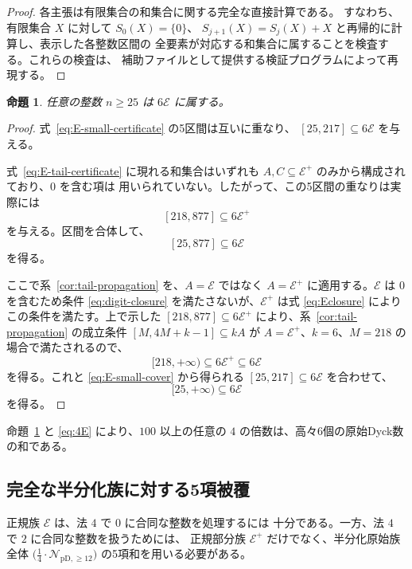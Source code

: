 \documentclass[12pt]{ltjsarticle}
\theoremstyle{plain}
\newtheorem{proposition}[theorem]{命題}
\theoremstyle{definition}
\theoremstyle{plain}
\newcommand{\Pset}{%
  \bigl(\tfrac{1}{4}\cdot\mathcal{N}_{\mathrm{pD},\geq 12}\bigr)%
}
\begin{document}
\begin{proof}
各主張は有限集合の和集合に関する完全な直接計算である。
すなわち、有限集合 $X$ に対して $S_0(X)=\{0\}$、
$S_{j+1}(X)=S_j(X)+X$ と再帰的に計算し、表示した各整数区間の
全要素が対応する和集合に属することを検査する。これらの検査は、
補助ファイルとして提供する検証プログラムによって再現する。
\end{proof}

\begin{proposition}\label{prop:E}
任意の整数 $n\geq25$ は $6\mathcal E$ に属する。
\end{proposition}

\begin{proof}
式~\eqref{eq:E-small-certificate} の5区間は互いに重なり、
$[25,217]\subseteq6\mathcal E$ を与える。

式~\eqref{eq:E-tail-certificate} に現れる和集合はいずれも
$A,C\subseteq\mathcal E^+$ のみから構成されており、$0$ を含む項は
用いられていない。したがって、この5区間の重なりは実際には
\[
 [218,877]\subseteq6\mathcal E^+
\]
を与える。区間を合体して、
\begin{equation}\label{eq:E-small-cover}
 [25,877]\subseteq6\mathcal E
\end{equation}
を得る。

ここで系~\ref{cor:tail-propagation} を、$A=\mathcal E$ ではなく
$A=\mathcal E^+$ に適用する。$\mathcal E$ は $0$ を含むため条件
\eqref{eq:digit-closure} を満たさないが、$\mathcal E^+$ は式
\eqref{eq:Eclosure} によりこの条件を満たす。上で示した
$[218,877]\subseteq6\mathcal E^+$ により、系~\ref{cor:tail-propagation}
の成立条件 $[M,4M+k-1]\subseteq kA$ が $A=\mathcal E^+$、$k=6$、$M=218$
の場合で満たされるので、
\[
 [218,+\infty)\subseteq6\mathcal E^+\subseteq6\mathcal E
\]
を得る。これと \eqref{eq:E-small-cover} から得られる
$[25,217]\subseteq6\mathcal E$ を合わせて、
\[
 [25,+\infty)\subseteq6\mathcal E
\]
を得る。
\end{proof}

命題~\ref{prop:E} と \eqref{eq:4E} により、$100$ 以上の任意の
$4$ の倍数は、高々6個の原始Dyck数の和である。

\subsection{完全な半分化族に対する5項被覆}

正規族 $\mathcal E$ は、法 $4$ で $0$ に合同な整数を処理するには
十分である。一方、法 $4$ で $2$ に合同な整数を扱うためには、
正規部分族 $\mathcal E^+$ だけでなく、半分化原始族全体
$\Pset$ の5項和を用いる必要がある。
\end{document}
